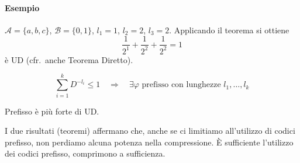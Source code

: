 \paragraph{Esempio} $\mathcal{A}=\{a,b,c\}$, $\mathcal{B}=\{0,1\}$, $l_1=1$, $l_2=2$, $l_3=2$. Applicando il teorema si ottiene
$$
    \frac{1}{2^1}+\frac{1}{2^2}+\frac{1}{2^2} = 1
$$
è UD (cfr.~anche Teorema Diretto).
\begin{center}
\end{center}

\begin{theorem}
    $$
        \sum_{i=1}^k D^{-l_i} \leq 1
        \quad \Rightarrow \quad
        \exists \varphi \text{ prefisso con lunghezze } l_1,\dots,l_k
    $$
\end{theorem}
Prefisso è più forte di UD.\medskip 

I due risultati (teoremi) affermano che, anche se ci limitiamo all'utilizzo di codici prefisso, non perdiamo alcuna potenza nella compressione. È sufficiente l'utilizzo dei codici prefisso, comprimono a sufficienza.

